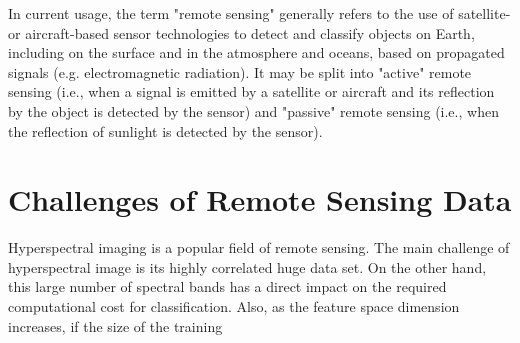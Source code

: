 \documentclass[document.tex]{subfiles}
\begin{document}
\noindent In current usage, the term "remote sensing" generally refers to the use of satellite- or aircraft-based sensor technologies to detect and classify objects on Earth, including on the surface and in the atmosphere and oceans, based on propagated signals (e.g. electromagnetic radiation). It may be split into "active" remote sensing (i.e., when a signal is emitted by a satellite or aircraft and its reflection by the object is detected by the sensor) and "passive" remote sensing (i.e., when the reflection of sunlight is detected by the sensor).

\section{Challenges of Remote Sensing Data}
\noindent Hyperspectral imaging is a popular field of remote sensing. The main challenge of hyperspectral image is its highly correlated huge data set. On the other hand, this large number of spectral bands has a direct impact on the required computational cost for classification. Also, as the feature space dimension increases, if the size of the training 
\end{document}
